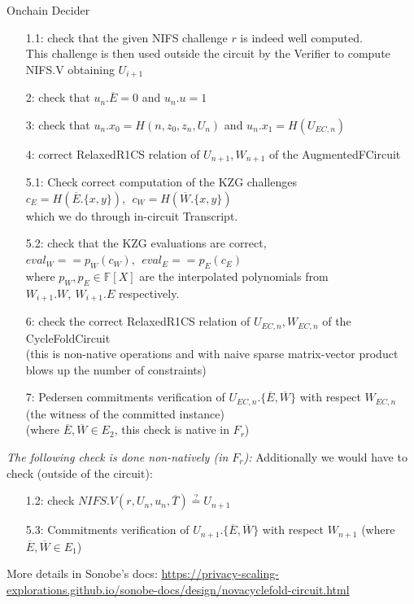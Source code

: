 \documentclass[t]{beamer} \usefonttheme[onlymath]{serif}
\begin{document}
\begin{frame}{Onchain Decider}
{\tiny
  \begin{enumerate}
    \item[1.1:] check that the given NIFS challenge $r$ is indeed well computed.
      \\This challenge is then used outside the circuit by the Verifier to compute NIFS.V obtaining $U_{i+1}$
    \item[2:] check that $u_n.\overline{E}=0$ and $u_n.u=1$
    \item[3:] check that $u_n.x_0 = H(n, z_0, z_n, U_n)$ and $u_n.x_1 = H(U_{EC,n})$
    \item[4:] correct RelaxedR1CS relation of $U_{n+1}, W_{n+1}$ of the AugmentedFCircuit
    \item[5.1:] Check correct computation of the KZG challenges
      \\$c_E = H(\overline{E}.\{x,y\}),~~c_W = H(\overline{W}.\{x,y\})$
      \\which we do through in-circuit Transcript.
    \item[5.2:] check that the KZG evaluations are correct, $eval_W == p_W(c_W),~~ eval_E == p_E(c_E)$
      \\where $p_W, p_E \in \mathbb{F}[X]$ are the interpolated polynomials from $W_{i+1}.W,~ W_{i+1}.E$ respectively.
    \item[6:] check the correct RelaxedR1CS relation of $U_{EC,n}, W_{EC,n}$ of the CycleFoldCircuit
      \\(this is non-native operations and with naive sparse matrix-vector product blows up the number of constraints)
    \item[7:] Pedersen commitments verification of $U_{EC,n}.\{ \overline{E}, \overline{W} \}$ with respect $W_{EC,n}$
      \\(the witness of the committed instance)
  \\(where $\overline{E},\overline{W} \in E_2$, this check is native in $F_r$)
  \end{enumerate}

  \emph{The following check is done non-natively (in $F_r$):}
  Additionally we would have to check (outside of the circuit):

  \begin{enumerate}
    \item[1.2:] check $NIFS.V(r, U_n, u_n, \overline{T}) \stackrel{?}{=} U_{n+1}$
    \item[5.3:] Commitments verification of $U_{n+1}.\{ \overline{E}, \overline{W} \}$ with respect $W_{n+1}$ (where $\overline{E}, \overline{W} \in E_1$)
  \end{enumerate}

  {\tiny More details in Sonobe's docs: \href{https://privacy-scaling-explorations.github.io/sonobe-docs/design/novacyclefold-circuit.html}{https://privacy-scaling-explorations.github.io/sonobe-docs/design/novacyclefold-circuit.html}}
}
\end{frame}
\end{document}
